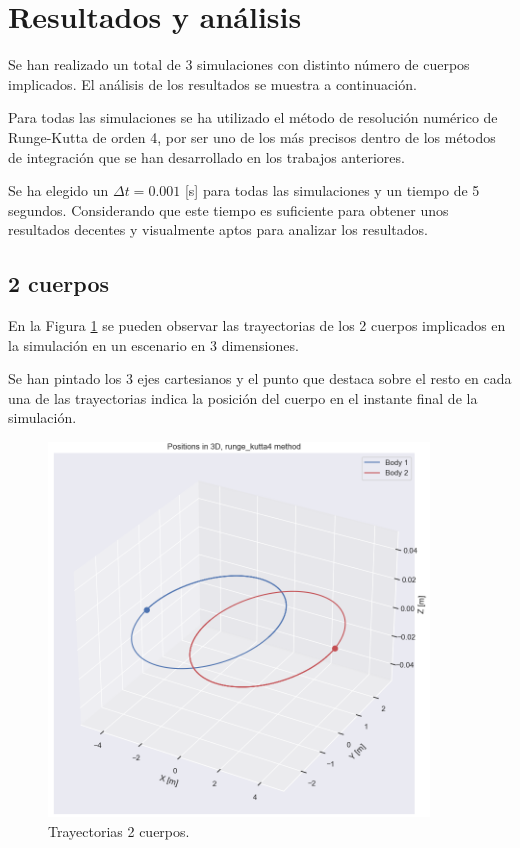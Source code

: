\documentclass[12pt,a4paper]{article}
\begin{document}
\section{Resultados y análisis}
Se han realizado un total de 3 simulaciones con distinto número de cuerpos implicados. El análisis de los resultados se muestra a continuación.

Para todas las simulaciones se ha utilizado el método de resolución numérico de Runge-Kutta de orden 4, por ser uno de los más precisos dentro de los métodos de integración que se han desarrollado en los trabajos anteriores. 

Se ha elegido un $\Delta t = 0.001$ [s] para todas las simulaciones y un tiempo de 5 segundos. Considerando que este tiempo es suficiente para obtener unos resultados decentes y visualmente aptos para analizar los resultados.

\subsection{2 cuerpos}
En la Figura \ref{2_body_3D} se pueden observar las trayectorias de los 2 cuerpos implicados en la simulación en un escenario en 3 dimensiones. 

Se han pintado los 3 ejes cartesianos y el punto que destaca sobre el resto en cada una de las trayectorias indica la posición del cuerpo en el instante final de la simulación.
\begin{figure}[H]
	\centering
	\includegraphics[width=0.90\textwidth]{FIGURES/mil5/2nb_plot3D.png}
	\caption{Trayectorias 2 cuerpos.}
	\label{2_body_3D}
\end{figure}
\end{document}
